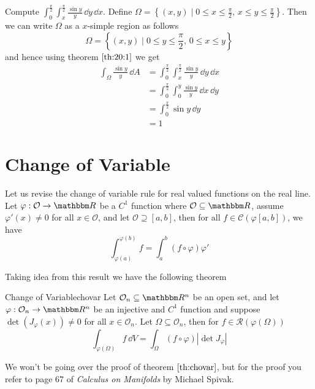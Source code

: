 \documentclass[../Analysis-3]{subfiles}
\begin{document}
\begin{Eg}{}{}
    Compute $\displaystyle{ \int_0^{\frac{\pi}{2}} \int_x^{\frac{\pi}{2}}} \frac{\sin y}{y} \, \dd y \, \dd x$. Define $\Omega = \left\{ (x,y) \mid 0 \leq x \leq \frac{\pi}{2}, \, x \leq y \leq \frac{\pi}{2} \right\}$. Then we can write $\Omega$ as a $x$-simple region as follows
    \[
        \Omega = \left\{ (x,y) \mid 0 \leq y \leq \frac{\pi}{2}, \, 0 \leq x \leq y \right\}
    \]
    and hence using theorem $\ref{th:20:1}$ we get
    \begin{align*}
        \int_{\Omega} \frac{\sin y}{y} \, \dd A & = \int_{0}^{\frac{\pi}{2}} \int_x^{\frac{\pi}{2}} \frac{\sin y}{y} \, \dd y \, \dd x \\
                                                & = \int_0^{\frac{\pi}{2}} \int_0^y \frac{\sin y}{y} \, \dd x \, \dd y                 \\
                                                & = \int_0^{\frac{\pi}{2}} \sin y \, \dd y                                             \\
                                                & = 1
    \end{align*}
\end{Eg}

\section{Change of Variable}

Let us revise the change of variable rule for real valued functions on the real line. Let $\varphi : \mathcal{O} \to \R$ be a $C^1$ function where $\mathcal{O} \subseteq \R$, assume $\varphi'(x) \neq 0$ for all $x \in \mathcal{O}$, and let $\mathcal{O} \supseteq [a,b]$, then for all $f \in \mathscr{C}(\varphi[a,b])$, we have
\[
    \int_{\varphi(a)}^{\varphi(b)} f = \int_a^b (f \circ \varphi) \varphi'
\]

Taking idea from this result we have the following theorem

\begin{Thm}{Change of Variable}{chovar}
    Let $\mathcal{O}_n \subseteq \R^n$ be an open set, and let $\varphi : \mathcal{O}_n \to \R^n$ be an injective and $C^1$ function and suppose $\det(J_{\varphi}(x)) \neq 0$ for all $x \in \mathcal{O}_n$. Let $\Omega \subseteq \mathcal{O}_n$, then for $f \in \mathscr{R}(\varphi(\Omega))$
    \[
        \int_{\varphi(\Omega)} f \, \dd V = \int_{\Omega} (f \circ \varphi) |\det J_{\varphi}|
    \]
\end{Thm}
We won't be going over the proof of theorem $\ref{th:chovar}$, but for the proof you refer to page 67 of \textit{Calculus on Manifolds} by Michael Spivak.
\end{document}
